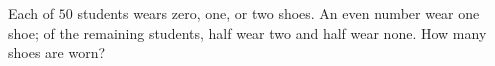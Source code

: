 Each of $50$ students wears zero, one, or two shoes. An even number wear one shoe; of the remaining students, half wear two and half wear none. How many shoes are worn?
